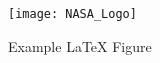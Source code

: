 \begin{figure}[H]
   \centering
   \texttt{[image: NASA\_Logo]}
   \caption{Example LaTeX Figure} 
   \label{fig:NASA_Logo}
\end{figure}